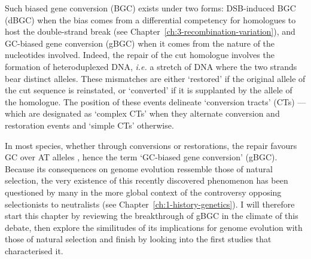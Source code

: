 Such biased gene conversion (BGC) exists under two forms: DSB-induced BGC (dBGC) when the bias comes from a differential competency for homologues to host the double-strand break (see Chapter~\ref{ch:3-recombination-variation}), and GC-biased gene conversion (gBGC) when it comes from the nature of the nucleotides involved.
Indeed, the repair of the cut homologue involves the formation of heteroduplexed DNA, \textit{i.e.} a stretch of DNA where the two strands bear distinct alleles.
These mismatches are either ‘restored’ if the original allele of the cut sequence is reinstated, or ‘converted’ if it is supplanted by the allele of the homologue.
The position of these events delineate ‘conversion tracts’ (CTs) — which are designated as ‘complex CTs’ when they alternate conversion and restoration events \citep{borts1989length} and ‘simple CTs’ otherwise.

In most species, whether through conversions or restorations, the repair favours GC over AT alleles \citep{pessia2012evidence,glemin2014gc,glemin2015quantification,figuet2014biased,wallberg2015extreme,bolivar2016recombination}, hence the term ‘GC-biased gene conversion’ (gBGC). 
Because its consequences on genome evolution ressemble those of natural selection, the very existence of this recently discovered phenomenon has been questioned by many in the more global context of the controversy opposing selectionists to neutralists (see Chapter~\ref{ch:1-history-genetics}).
I will therefore start this chapter by reviewing the breakthrough of gBGC in the climate of this debate, then explore the similitudes of its implications for genome evolution with those of natural selection and finish by looking into the first studies that characterised it.



